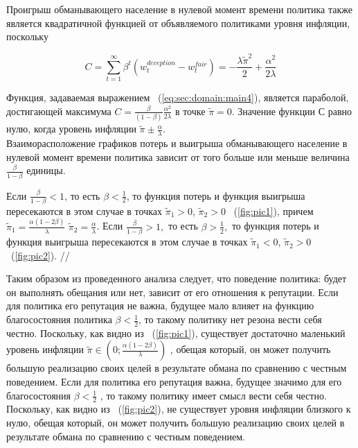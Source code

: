 Проигрыш обманывающего население в нулевой момент времени политика также является квадратичной функцией от объявляемого политиками уровня инфляции, поскольку

\begin{equation}
	\label{eq:sec:domain:main4}
C=\sum_{t=1}^{\infty} \beta^t(w^{deception}_t - w^{fair}_t) = -\frac{\lambda\tilde{\pi}^2}{2}+\frac{\alpha^2}{2\lambda}
\end{equation}



Функция, задаваемая выражением ~(\ref{eq:sec:domain:main4}), является параболой, достигающей максимума $C=\frac{\beta}{(1-\beta)}\frac{\alpha^2}{2\lambda} $  в точке   $\tilde{\pi}=0$. Значение функции $С$ равно нулю, когда уровень инфляции   $\tilde{\pi}\pm\frac{\alpha}{\lambda}$.
\\



Взаиморасположение графиков потерь и выигрыша обманывающего население в нулевой момент времени политика зависит от того больше или меньше величина $\frac{\beta}{1-\beta}$  единицы.

Если   $\frac{\beta}{1-\beta}<1$, то есть  $\beta<\frac{1}{2}$, то функция потерь и функция выигрыша пересекаются в этом случае в точках  $\tilde{\pi}_1>0$, $\tilde{\pi}_2>0$ ~(\ref{fig:pic1}), причем  $\tilde{\pi}_1= \frac{\alpha(1-2\beta)}{\lambda}$ $\tilde{\pi}_2=\frac{\alpha}{\lambda}$. Если  $\frac{\beta}{1-\beta}>1,$  то есть  $\beta>\frac{1}{2},$  то функция потерь и функция выигрыша пересекаются в этом случае в точках   $\tilde{\pi}_1<0$, $\tilde{\pi}_2>0$ ~(\ref{fig:pic2}).
//

Таким образом из проведенного анализа следует, что поведение политика: будет он выполнять обещания или нет, зависит от его отношения к репутации. Если для политика его репутация не важна, будущее мало влияет на функцию благосостояния политика  $\beta<\frac{1}{2}$, то такому политику нет резона вести себя честно. Поскольку, как видно из ~(\ref{fig:pic1}), существует достаточно маленький уровень инфляции $\tilde{\pi}\in\left(0;\frac{\alpha(1-2\beta)}{\lambda} \right)$ , обещая который, он может получить большую реализацию своих целей в результате обмана по сравнению с честным поведением. Если для политика его репутация важна, будущее значимо для его благосостояния $\beta<\frac{1}{2}$ , то такому политику имеет смысл вести себя честно. Поскольку, как видно из  ~(\ref{fig:pic2}), не существует уровня инфляции близкого к нулю, обещая который, он может получить большую реализацию своих целей в результате обмана по сравнению с честным поведением.